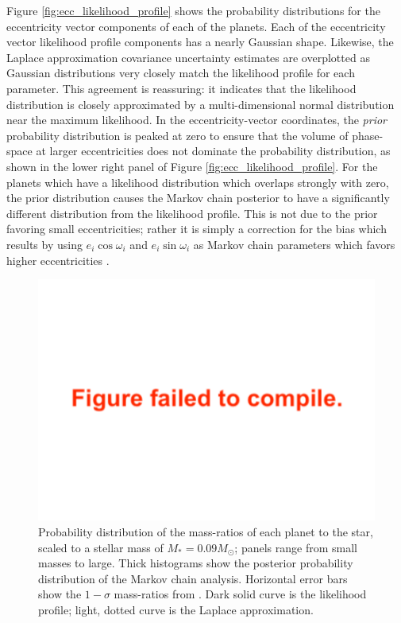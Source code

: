\documentclass[twocolumn]{aastex63}
\begin{document}
Figure \ref{fig:ecc_likelihood_profile} shows the probability distributions
for the eccentricity vector components of each of the planets.
Each of the eccentricity vector likelihood profile components
has a nearly Gaussian
shape.  Likewise, the Laplace approximation covariance uncertainty estimates are overplotted as
Gaussian distributions very closely match the likelihood profile
for each parameter.  This agreement is reassuring:  it indicates
that the likelihood distribution is closely approximated by
a multi-dimensional normal distribution near the maximum likelihood.
In the eccentricity-vector coordinates,
the {\it prior} probability distribution is peaked
at zero to ensure that the volume of phase-space at larger
eccentricities does not dominate the probability distribution,
as shown in the lower right panel of Figure \ref{fig:ecc_likelihood_profile}.
For the planets which have
a likelihood distribution which overlaps strongly with zero,
the prior distribution causes the Markov chain posterior to
have a significantly different distribution from the likelihood profile.  This is not
due to the prior favoring small eccentricities;  rather it is simply
a correction for the bias which results by using $e_i\cos{\omega_i}$
and $e_i\sin{\omega_i}$ as Markov chain parameters which favors
higher eccentricities \citep{Ford2006}.

\begin{figure}
    \centering
    \includegraphics[width=\hsize]{figures/T1_masses_03312020.pdf}
    {Probability distribution of the mass-ratios of each planet to the star, scaled to a stellar mass of $M_*  = 0.09 M_\odot$; panels range from small masses to large.   Thick
        histograms show the posterior probability distribution of the Markov chain analysis.
        Horizontal error bars show the $1-\sigma$ mass-ratios from \citet{Grimm2018}.
        Dark solid curve is the likelihood profile; light, dotted curve is the Laplace approximation.}
    \label{fig:mass_likelihood_profile}
\end{figure}
\end{document}
